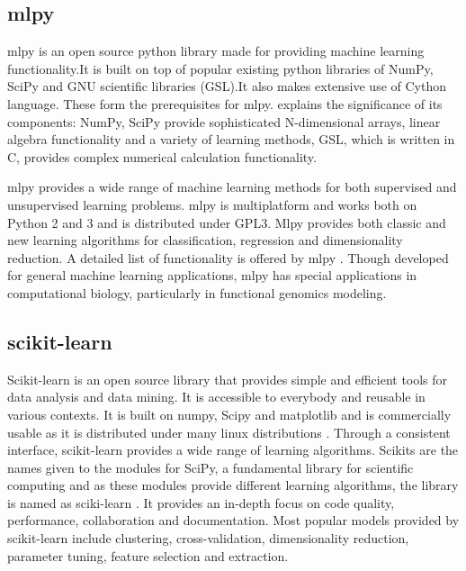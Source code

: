 \subsection{mlpy }
    
    mlpy is an open source python library made for providing machine
    learning functionality.It is built on top of popular existing
    python libraries of NumPy, SciPy and GNU scientific libraries
    (GSL).It also makes extensive use of Cython language. These form
    the prerequisites for
    mlpy. \cite{DBLP:journals/corr/abs-1202-6548} explains the
    significance of its components: NumPy, SciPy provide
    sophisticated N-dimensional arrays, linear algebra functionality
    and a variety of learning methods, GSL, which is written in C,
    provides complex numerical calculation functionality.

    mlpy provides a wide range of machine learning methods for both
    supervised and unsupervised learning problems. mlpy is multiplatform
    and works both on Python 2 and 3 and is distributed under GPL3. Mlpy
    provides both classic and new learning algorithms for classification,
    regression and dimensionality reduction. A detailed list of functionality
    is offered by mlpy \cite{www-mlpy}. Though
    developed for general machine learning applications, mlpy has special
    applications in computational biology, particularly in functional
    genomics modeling.

    \pv

\subsection{scikit-learn}

    Scikit-learn is an open source library that provides simple and
    efficient tools for data analysis and data mining. It is
    accessible to everybody and reusable in various contexts. It is
    built on numpy, Scipy and matplotlib and is commercially usable as
    it is distributed under many linux distributions
    \cite{scik1}. Through a consistent interface, scikit-learn
    provides a wide range of learning algorithms. Scikits are the
    names given to the modules for SciPy, a fundamental library for
    scientific computing and as these modules provide different
    learning algorithms, the library is named as sciki-learn
    \cite{scik2}. It provides an in-depth focus on code quality,
    performance, collaboration and documentation. Most popular models
    provided by scikit-learn include clustering, cross-validation,
    dimensionality reduction, parameter tuning, feature selection and
    extraction.

